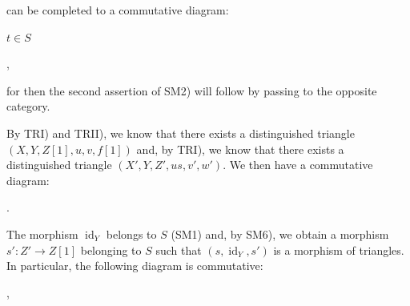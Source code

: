 \clearpage
{}%
\begingroup
\small
\setlength{\emergencystretch}{1.5em}%
\setlength{\abovedisplayskip}{2pt plus 1pt minus 1pt}%
\setlength{\belowdisplayskip}{2pt plus 1pt minus 1pt}%

\noindent can be completed to a commutative diagram:

\begin{center}
  $t\in S$\qquad
  \quad ,
\end{center}

\noindent for then the second assertion of SM2) will follow by passing to the
opposite category.

By TRI) and TRII), we know that there exists a distinguished triangle
$(X,Y,Z[1],u,v,f[1])$ and, by TRI), we know that there exists a distinguished
triangle $(X',Y,Z',us,v',w')$. We then have a commutative diagram:

\begin{center}
  \quad .
\end{center}

\noindent The morphism $\operatorname{id}_Y$ belongs to $S$ (SM1) and, by
SM6), we obtain a morphism $s'\colon Z'\to Z[1]$ belonging to $S$ such that
$(s,\operatorname{id}_Y,s')$ is a morphism of triangles. In particular, the
following diagram is commutative:

\begin{center}
  \quad ,
\end{center}

